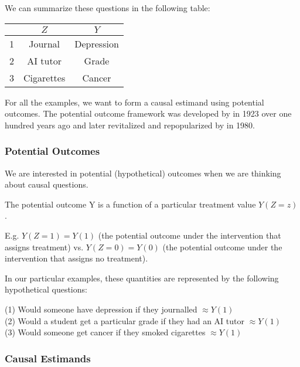 \documentclass[11pt]{elegantbook}
\begin{document}
We can summarize these questions in the following table: \par
\begin{center}
\begin{tabular}{ccc}
  \hline
  & \textbf{$Z$} & \textbf{$Y$} \\
  \hline
  1 & Journal & Depression \\
  \hline
  2 & AI tutor & Grade  \\
  \hline
  3 & Cigarettes & Cancer  \\
  \hline
\end{tabular}
\end{center}

For all the examples, we want to form a causal estimand using potential outcomes. The potential outcome framework was developed by \cite{neyman1923} in 1923 over one hundred years ago and later revitalized and repopularized by \cite{rubin1980} in 1980. 

\subsubsection{Potential Outcomes}

We are interested in potential (hypothetical) outcomes when we are thinking about causal questions.

\begin{definition}
    The potential outcome Y is a function of a particular treatment value $Y(Z=z)$.
\end{definition}

E.g. $Y(Z=1) = Y(1)$ (the potential outcome under the intervention that assigns treatment) vs. $Y(Z=0) = Y(0)$ (the potential outcome under the intervention that assigns no treatment).

In our particular examples, these quantities are represented by the following hypothetical questions: \par

(1) Would someone have depression if they journalled $\approx Y(1)$ \\
(2) Would a  student get a particular grade if they had an AI tutor $\approx Y(1)$ \\
(3) Would someone get cancer if they smoked cigarettes $\approx Y(1)$

\subsubsection{Causal Estimands}
\end{document}
